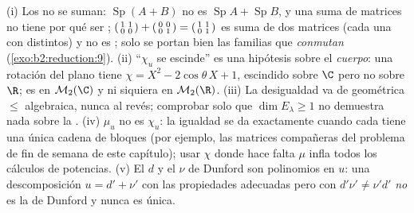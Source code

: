 \begin{remark}\label{rem:b2:reduction:pitfalls}
(i) Los  no se suman: $\operatorname{Sp}(A + B)$ no
es $\operatorname{Sp}A + \operatorname{Sp}B$, y una suma de matrices
 no tiene por qué ser ;
$\begin{psmallmatrix}1 & 1\\ 0 & 0\end{psmallmatrix} +
\begin{psmallmatrix}0 & 0\\ 0 & 1\end{psmallmatrix} =
\begin{psmallmatrix}1 & 1\\ 0 & 1\end{psmallmatrix}$ es suma de dos
matrices  (cada una con 
distintos) y no es ; solo se portan bien las
familias que \emph{conmutan} (\cref{exo:b2:reduction:9}). (ii)
``$\chi_u$ se escinde'' es una hipótesis sobre el \emph{cuerpo}: una
rotación del plano tiene $\chi = X^2 - 2\cos\theta\,X + 1$,
escindido sobre $\C$ pero no sobre $\R$; es  en
$\mathcal{M}_2(\C)$ y ni siquiera  en
$\mathcal{M}_2(\R)$. (iii) La desigualdad va de geométrica $\leq$
algebraica, nunca al revés; comprobar solo que $\dim E_\lambda \geq
1$ no demuestra nada sobre la . (iv) $\mu_u$ no
es $\chi_u$: la igualdad se da exactamente cuando cada 
tiene una única cadena de bloques (por ejemplo, las matrices
compañeras del problema de fin de semana de este capítulo); usar
$\chi$ donde hace falta $\mu$ infla todos los cálculos de potencias.
(v) El $d$ y el $\nu$ de Dunford son polinomios en $u$: una
descomposición $u = d' + \nu'$ con las propiedades adecuadas pero
con $d'\nu' \neq \nu'd'$ \emph{no} es la de Dunford y nunca es
única.
\end{remark}

